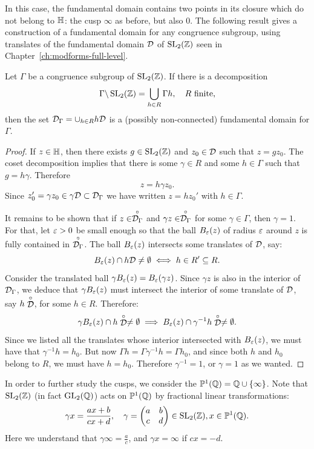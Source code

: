 In this case, the fundamental domain contains two points in its closure which do not belong to $\mathbb{H}$: the cusp $\infty$ as before, but also $0$. The following result gives a construction of a fundamental domain for any congruence subgroup, using translates of the fundamental domain $\mathcal{D}$ of $\operatorname{SL}_2(\mathbb{Z})$ seen in Chapter~\ref{ch:modforms-full-level}.
\begin{proposition}
  Let $\Gamma$ be a congruence subgroup of $\operatorname{SL}_2(\mathbb{Z})$. If there is a decomposition
\[
\Gamma\backslash \operatorname{SL}_2(\mathbb{Z})=\bigcup_{h\in R} \Gamma h,\quad R\text{ finite,}
\]
then the set $\mathcal{D}_\Gamma=\cup_{h\in R} h\mathcal{D}$ is a (possibly non-connected) fundamental domain for $\Gamma$.
\end{proposition}
\begin{proof}
  If $z\in\mathbb{H}$, then there exists $g\in\operatorname{SL}_2(\mathbb{Z})$ and $z_0\in\mathcal{D}$ such that $z = gz_0$. The coset decomposition implies that there is some $\gamma\in R$ and some $h\in \Gamma$ such that $g=h\gamma$. Therefore
\[
z = h\gamma z_0.
\]
Since $z_0'=\gamma z_0\in \gamma\mathcal{D}\subset \mathcal{D}_\Gamma$ we have written $z=h z_0'$ with $h\in\Gamma$.

It remains to be shown that if $z\in\stackrel{\circ}{\mathcal{D}_\Gamma}$ and $\gamma z \in\stackrel{\circ}{\mathcal{D}_\Gamma}$ for some $\gamma\in\Gamma$, then $\gamma = 1$. For that, let $\varepsilon>0$ be small enough so that the ball $B_\varepsilon(z)$ of radius $\varepsilon$ around $z$ is fully contained in $\stackrel{\circ}{\mathcal{D}_\Gamma}$. The ball $B_\varepsilon(z)$ intersects some translates of $\mathcal{D}$, say:
\[
B_\varepsilon(z)\cap h\mathcal{D} \neq \emptyset\iff h\in R'\subseteq R.
\]
Consider the translated ball $\gamma B_\varepsilon(z)=B_\varepsilon(\gamma z)$. Since $\gamma z$ is also in the interior of $\mathcal{D}_\Gamma$, we deduce that $\gamma B_\varepsilon(z)$ must intersect the interior of some translate of $\mathcal{D}$, say $h\stackrel{\circ}{\mathcal{D}}$, for some $h\in R$. Therefore:
\[
\gamma B_\varepsilon(z)\cap h\stackrel{\circ}{\mathcal{D}}\neq \emptyset \implies B_\varepsilon(z)\cap \gamma^{-1}h\stackrel{\circ}{\mathcal{D}}\neq \emptyset.
\]
Since we listed all the translates whose interior intersected with $B_\varepsilon(z)$, we must have that $\gamma^{-1}h = h_0$. But now $\Gamma h = \Gamma \gamma^{-1}h = \Gamma h_0$, and since both $h$ and $h_0$ belong to $R$, we must have $h=h_0$. Therefore $\gamma^{-1}=1$, or $\gamma=1$ as we wanted.
\end{proof}

In order to further study the cusps, we consider the  $\mathbb{P}^1(\mathbb{Q})=\mathbb{Q} \cup\{\infty\}$. Note that $\operatorname{SL}_2(\mathbb{Z})$ (in fact $\operatorname{GL}_2(\mathbb{Q})$) acts on $\mathbb{P}^1(\mathbb{Q})$ by fractional linear transformations:
\[
\gamma x = \frac{ax +b}{cx+d},\quad \gamma = \left(\begin{matrix}a&b\\c&d\end{matrix}\right)\in\operatorname{SL}_2(\mathbb{Z}),x\in\mathbb{P}^1(\mathbb{Q}).
\]
Here we understand that $\gamma\infty = \frac ac$, and $\gamma x = \infty$ if $cx = -d$.

